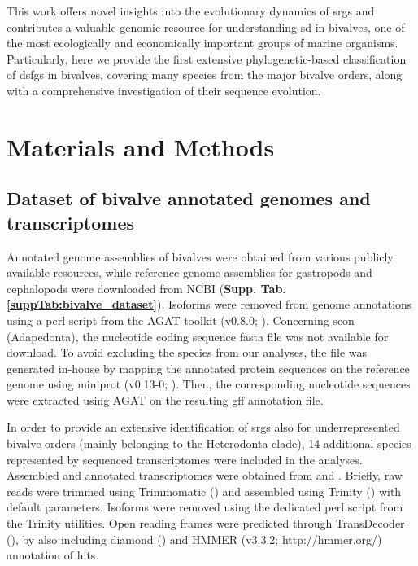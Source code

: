 \documentclass[../main.tex]{subfiles}
\begin{document}
This work offers novel insights into the evolutionary dynamics of \glspl{srg} and contributes a valuable genomic resource for understanding \gls{sd} in bivalves, one of the most ecologically and economically important groups of marine organisms. Particularly, here we provide the first extensive phylogenetic-based classification of \glspl{dsfg} in bivalves, covering many species from the major bivalve orders, along with a comprehensive investigation of their sequence evolution.

\section{Materials and Methods} \label{chapter3_MM}
\subsection{Dataset of bivalve annotated genomes and transcriptomes}
Annotated genome assemblies of bivalves were obtained from various publicly available resources, while reference genome assemblies for gastropods and cephalopods were downloaded from NCBI (\textbf{Supp. Tab. \ref{suppTab:bivalve_dataset}}). Isoforms were removed from genome annotations using a perl script from the AGAT toolkit (v0.8.0; \textbf{\cite{dainat2022another}}). Concerning \gls{scon} (Adapedonta), the nucleotide coding sequence fasta file was not available for download. To avoid excluding the species from our analyses, the file was generated in-house by mapping the annotated protein sequences on the reference genome using miniprot (v0.13-0; \textbf{\cite{li2023miniprot}}). Then, the corresponding nucleotide sequences were extracted using AGAT on the resulting gff annotation file.

In order to provide an extensive identification of \glspl{srg} also for underrepresented bivalve orders (mainly belonging to the Heterodonta clade), 14 additional species represented by sequenced transcriptomes were included in the analyses. Assembled and annotated transcriptomes were obtained from \textbf{\cite{piccinini2021mitonuclear}} and \textbf{\cite{iannello2023signatures}}. Briefly, raw reads were trimmed using Trimmomatic (\textbf{\cite{bolger2014trimmomatic}}) and assembled using Trinity (\textbf{\cite{grabherr2011trinity}}) with default parameters. Isoforms were removed using the dedicated perl script from the Trinity utilities. Open reading frames were predicted through TransDecoder (\textbf{\cite{haasTransdecoder}}), by also including diamond (\textbf{\cite{buchfink2015fast}}) and HMMER (v3.3.2; http://hmmer.org/) annotation of hits.
\end{document}
